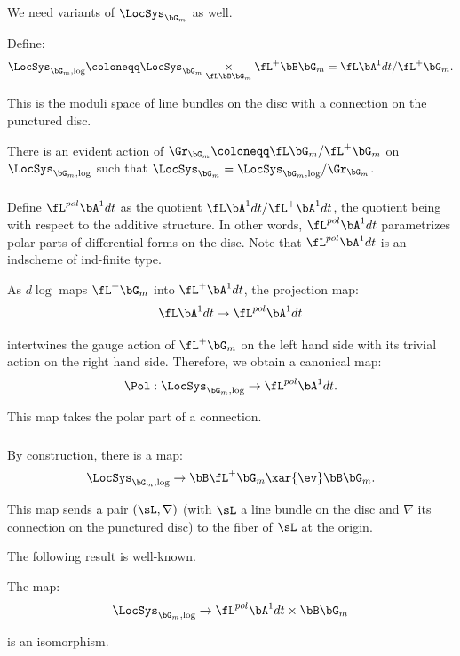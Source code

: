 \subsubsection{}

We need variants of $\LocSys_{\bG_m}$ as well.

Define:
%
\[
\LocSys_{\bG_m,\log} \coloneqq
\LocSys_{\bG_m} \underset{\fL \bB\bG_m}{\times} \fL^+ \bB \bG_m =
\fL \bA^1 dt/\fL^+ \bG_m.
\]

 This is the moduli space of line bundles on the
disc with a connection on the punctured disc.

There is an
evident action of $\Gr_{\bG_m} \coloneqq \fL \bG_m/\fL^+ \bG_m$
on $\LocSys_{\bG_m,\log}$ such that
$\LocSys_{\bG_m} = \LocSys_{\bG_m,\log}/\Gr_{\bG_m}$.

\subsubsection{}

Define $\fL^{pol} \bA^1 dt$ as the quotient
$\fL \bA^1 dt / \fL^+\bA^1 dt$, the quotient being with respect
to the additive structure. In other words, $\fL^{pol} \bA^1 dt$
parametrizes polar parts of differential forms on the disc.
Note that $\fL^{pol} \bA^1 dt$ is an indscheme of ind-finite type.

As $d\log$ maps $\fL^+ \bG_m$ into $\fL^+ \bA^1 dt$, the
projection map:
%
\[
\fL \bA^1 dt \to \fL^{pol} \bA^1 dt
\]

 intertwines the gauge action of $\fL^+ \bG_m$ on
the left hand side with its trivial action on the right hand
side. Therefore, we obtain a canonical map:
%
\[
\Pol: \LocSys_{\bG_m,\log} \to \fL^{pol} \bA^1 dt.
\]

 This map takes the polar part of a connection.

\subsubsection{}

By construction, there is a map:
%
\[
\LocSys_{\bG_m,\log} \to \bB \fL^+ \bG_m \xar{\ev} \bB \bG_m.
\]

 This map sends a pair $(\sL,\nabla)$ (with $\sL$ a line
bundle on the disc and $\nabla$ its connection on the punctured
disc) to the fiber of $\sL$ at the origin.

The following result is well-known.

\begin{prop}
\notready\label{p:locsys-log}

The map:
%
\[
\LocSys_{\bG_m,\log} \to \fL^{pol} \bA^1 dt \times \bB \bG_m
\]

 is an isomorphism.

\end{prop}

